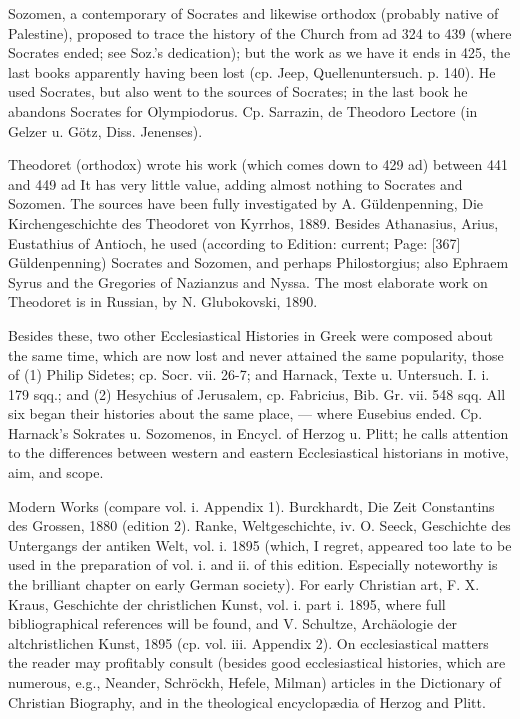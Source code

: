 Sozomen, a contemporary of Socrates and likewise orthodox (probably native of Palestine), proposed to trace the history of the Church from ad 324 to 439 (where Socrates ended; see Soz.\texthebrew{}’s dedication); but the work as we have it ends in 425, the last books apparently having been lost (cp. Jeep, Quellenuntersuch. p. 140). He used Socrates, but also went to the sources of Socrates; in the last book he abandons Socrates for Olympiodorus. Cp. Sarrazin, de Theodoro Lectore (in Gelzer u. Götz, Diss. Jenenses).

Theodoret (orthodox) wrote his work (which comes down to 429 ad) between 441 and 449 ad It has very little value, adding almost nothing to Socrates and Sozomen. The sources have been fully investigated by A. Güldenpenning, Die Kirchengeschichte des Theodoret von Kyrrhos, 1889. Besides Athanasius, Arius, Eustathius of Antioch, he used (according to Edition: current; Page: [367] Güldenpenning) Socrates and Sozomen, and perhaps Philostorgius; also Ephraem Syrus and the Gregories of Nazianzus and Nyssa. The most elaborate work on Theodoret is in Russian, by N. Glubokovski, 1890.

Besides these, two other Ecclesiastical Histories in Greek were composed about the same time, which are now lost and never attained the same popularity, those of (1) Philip Sidetes; cp. Socr. vii. 26-7; and Harnack, Texte u. Untersuch. I. i. 179 sqq.; and (2) Hesychius of Jerusalem, cp. Fabricius, Bib. Gr. vii. 548 sqq. All six began their histories about the same place, \texthebrew{—} where Eusebius ended. Cp. Harnack\texthebrew{}’s Sokrates u. Sozomenos, in Encycl. of Herzog u. Plitt; he calls attention to the differences between western and eastern Ecclesiastical historians in motive, aim, and scope.

Modern Works (compare vol. i. Appendix 1). Burckhardt, Die Zeit Constantins des Grossen, 1880 (edition 2). Ranke, Weltgeschichte, iv. O. Seeck, Geschichte des Untergangs der antiken Welt, vol. i. 1895 (which, I regret, appeared too late to be used in the preparation of vol. i. and ii. of this edition. Especially noteworthy is the brilliant chapter on early German society). For early Christian art, F. X. Kraus, Geschichte der christlichen Kunst, vol. i. part i. 1895, where full bibliographical references will be found, and V. Schultze, Archäologie der altchristlichen Kunst, 1895 (cp. vol. iii. Appendix 2). On ecclesiastical matters the reader may profitably consult (besides good ecclesiastical histories, which are numerous, e.g., Neander, Schröckh, Hefele, Milman) articles in the Dictionary of Christian Biography, and in the theological encyclopædia of Herzog and Plitt.

